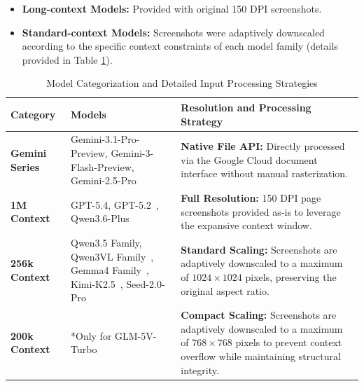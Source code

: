 \documentclass[]{opendatalab}
\begin{document}
{{{\begin{itemize}
 \item \textbf{Long-context Models:} Provided with original 150 DPI screenshots.
 \item \textbf{Standard-context Models:} Screenshots were adaptively downscaled according to the specific context constraints of each model family (details provided in Table \ref{tab:appendix_model_specs}).
\end{itemize}

\begin{table}[htbp]
\centering
\small
\caption{Model Categorization and Detailed Input Processing Strategies}
\label{tab:appendix_model_specs}
\begin{tabularx}{\textwidth}{l p{3.5cm} X}
\toprule
\textbf{Category} & \textbf{Models} & \textbf{Resolution and Processing Strategy} \\
\midrule
\textbf{Gemini Series~\citep{team2023gemini}} & Gemini-3.1-Pro-Preview, \newline Gemini-3-Flash-Preview, \newline Gemini-2.5-Pro & \textbf{Native File API:} Directly processed via the Google Cloud document interface without manual rasterization. \\
\midrule
\textbf{1M Context} & GPT-5.4, GPT-5.2~\citep{achiam2023gpt}, \newline Qwen3.6-Plus & \textbf{Full Resolution:} 150 DPI page screenshots provided as-is to leverage the expansive context window. \\
\midrule
\textbf{256k Context} & Qwen3.5 Family, \newline Qwen3VL Family~\citep{bai2025qwen3}, \newline Gemma4 Family~\citep{team2024gemma}, \newline Kimi-K2.5~\citep{team2024gemma}, \newline Seed-2.0-Pro~\citep{seed2026seed18modelcardgeneralized} & \textbf{Standard Scaling:} Screenshots are adaptively downscaled to a maximum of $1024 \times 1024$ pixels, preserving the original aspect ratio. \\
\midrule
\textbf{200k Context} & *Only for \newline GLM-5V-Turbo~\citep{zeng2026glm} & \textbf{Compact Scaling:} Screenshots are adaptively downscaled to a maximum of $768 \times 768$ pixels to prevent context overflow while maintaining structural integrity. \\
\bottomrule
\end{tabularx}
\end{table}

}}}
\end{document}
